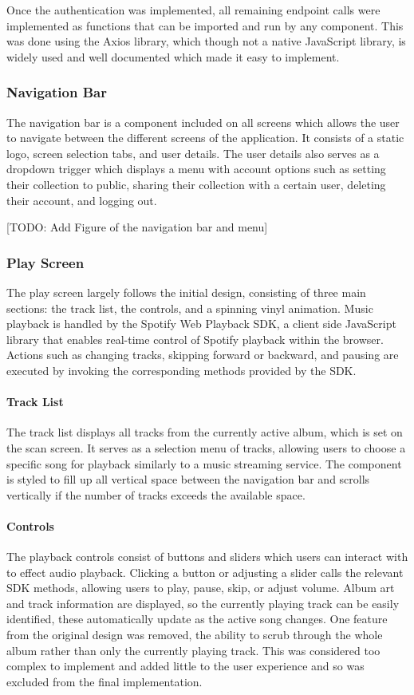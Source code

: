 Once the authentication was implemented, all remaining endpoint calls were implemented as functions that can be imported and run by any component. This was done using the Axios library, which though not a native JavaScript library, is widely used and well documented which made it easy to implement.

\subsubsection{Navigation Bar}
The navigation bar is a component included on all screens which allows the user to navigate between the different screens of the application. It consists of a static logo, screen selection tabs, and user details. The user details also serves as a dropdown trigger which displays a menu with account options such as setting their collection to public, sharing their collection with a certain user, deleting their account, and logging out.

[TODO: Add Figure of the navigation bar and menu]

\subsubsection{Play Screen}
The play screen largely follows the initial design, consisting of three main sections: the track list, the controls, and a spinning vinyl animation. Music playback is handled by the Spotify Web Playback SDK, a client side JavaScript library that enables real-time control of Spotify playback within the browser. Actions such as changing tracks, skipping forward or backward, and pausing are executed by invoking the corresponding methods provided by the SDK.

\paragraph{Track List}
The track list displays all tracks from the currently active album, which is set on the scan screen. It serves as a selection menu of tracks, allowing users to choose a specific song for playback similarly to a music streaming service. The component is styled to fill up all vertical space between the navigation bar and scrolls vertically if the number of tracks exceeds the available space.

\paragraph{Controls}
The playback controls consist of buttons and sliders which users can interact with to effect audio playback. Clicking a button or adjusting a slider calls the relevant SDK methods, allowing users to play, pause, skip, or adjust volume. Album art and track information are displayed, so the currently playing track can be easily identified, these automatically update as the active song changes.
One feature from the original design was removed, the ability to scrub through the whole album rather than only the currently playing track. This was considered too complex to implement and added little to the user experience and so was excluded from the final implementation.


